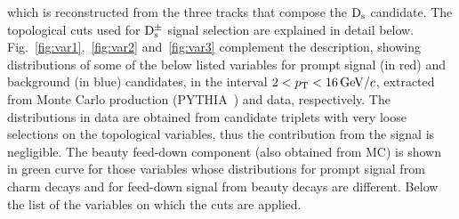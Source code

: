 which is reconstructed from the three tracks that compose the ${\rm D_s}$
candidate. The topological cuts used for ${\rm D_s^{\pm}}$ signal selection
 are explained in detail below. Fig.~\ref{fig:var1},~\ref{fig:var2} and~\ref{fig:var3} complement
 the description, showing distributions of some of the below listed variables
 for prompt signal (in red) and background (in blue) candidates, in the interval $2 < p_{\rm T} < 16 \, \mathrm{GeV}/c$, 
 extracted from Monte Carlo production (PYTHIA~\cite{Sjostrand:2006za}) and data, respectively.
 The distributions in data are obtained from candidate triplets with very loose
 selections on the topological variables, thus the contribution from the signal is negligible.
 The beauty feed-down component (also obtained from MC) is shown
 in green curve for those variables whose distributions for prompt signal
 from charm decays and for feed-down signal from beauty decays are different.
 Below the list of the variables on which the cuts are applied.
